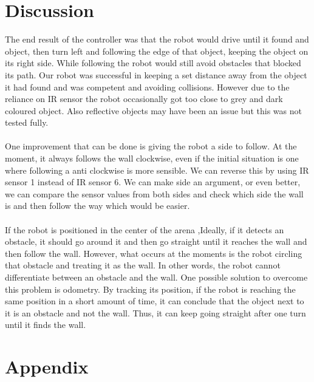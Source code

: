 \documentclass[]{article}
\begin{document}
\section{Discussion}
The end result of the controller was that the robot would drive until it found and object, then turn left and following the edge of that object, keeping the object on its right side. While following the robot would still avoid obstacles that blocked its path. Our robot was successful in keeping a set distance away from the object it had found and was competent and avoiding collisions. However due to the reliance on IR sensor the robot occasionally got too close to grey and dark coloured object. Also reflective objects may have been an issue but this was not tested fully.\\\\
One improvement that can be done is giving the robot a side to follow. At the moment, it always follows the wall clockwise, even if the initial situation is one where following  a anti clockwise is more sensible. We can reverse this by using IR sensor 1 instead of IR sensor 6. We can make side an argument, or even better, we can compare the sensor values from both sides and check which side the wall is and then follow the way which would be easier. \\\\
If the robot is positioned in the center of the arena ,Ideally, if it detects an obstacle, it should go around it and then go straight until it reaches the wall and then follow the wall. However, what occurs at the moments is the robot circling that obstacle and treating it as the wall. In other words, the robot cannot differentiate between an obstacle and the wall. One possible solution to overcome this problem is odometry. By tracking its position, if the robot is reaching the same position in a short amount of time, it can conclude that the object next to it is an obstacle and not the wall. Thus, it can keep going straight after one turn until it finds the wall.

\section{Appendix}

\end{document}
